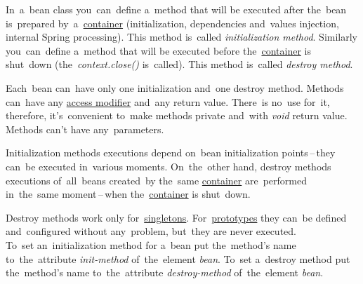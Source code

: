 In~a~bean class you~can~define a~method that will be executed after the~bean is~prepared by~a~\hyperref[springcontainrer]{container} (initialization, dependencies and~values injection, internal Spring processing). This method is~called \textit{initialization method}. Similarly you~can~define a~method that will be executed before the~\hyperref[springcontainrer]{container} is shut~down (the~\textit{context.close()} is~called). This method is~called \textit{destroy method}.

Each~bean can~have only one initialization and~one destroy method. Methods can~have any \hyperref[accessmodifiers]{access modifier} and~any return value. There~is no~use for~it, therefore, it's~convenient to~make methods private and~with \textit{void} return value. Methods can't have any~parameters.

Initialization methods executions depend on~bean initialization points\,--\,they can~be executed in~various moments. On~the~other hand, destroy methods executions of~all~beans created~by the~same \hyperref[springcontainrer]{container} are~performed in~the~same moment\,--\,when the~\hyperref[springcontainrer]{container} is shut~down.

\warning Destroy methods work only for~\hyperref[singletondp]{singletons}. For~\hyperref[prototypedp]{prototypes} they can~be defined and~configured without any~problem, but~they are never executed.\\

\noindent To~set an~initialization method for a~bean put the~method's name to~the~attribute \textit{init-method} of~the~element \textit{bean}. To~set a~destroy method put the~method's name to~the~attribute \textit{destroy-method} of~the~element \textit{bean}.
\newpage

